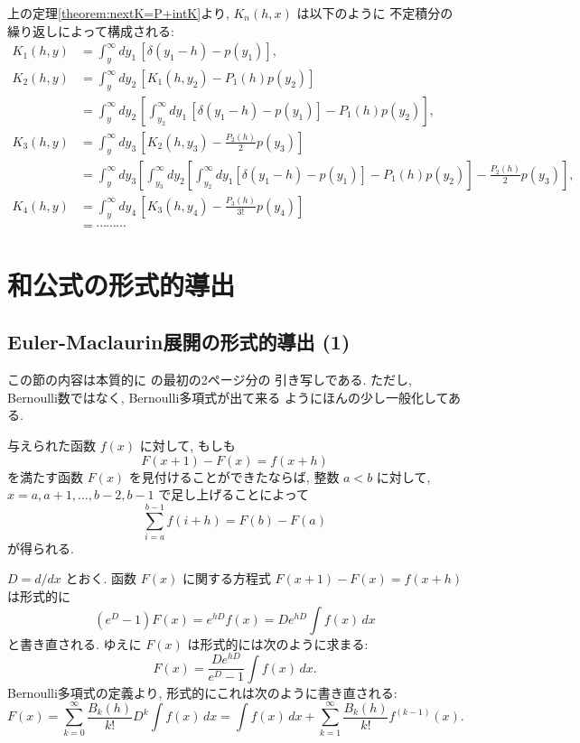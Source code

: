 \documentclass[12pt,twoside]{jarticle}
\theoremstyle{jplain}
\theoremstyle{jplain}
\theoremstyle{jplain}
\numberwithin{theorem}{section}
\numberwithin{equation}{section}
\numberwithin{figure}{section}
\numberwithin{table}{section}
\newcommand\theoremref[1]{定理\ref{#1}}
\begin{document}
上の\theoremref{theorem:nextK=P+intK}より, $K_n(h,x)$ は以下のように
不定積分の繰り返しによって構成される:
\begin{align*}
  K_1(h,y) &= \int_y^\infty dy_1\,[\delta(y_1-h)-p(y_1)],
  \\
  K_2(h,y) &= \int_y^\infty dy_2\,[K_1(h,y_2)-P_1(h)p(y_2)]
  \\
  &=\int_y^\infty dy_2\,\left[
      \int_{y_2}^\infty dy_1\,[\delta(y_1-h)-p(y_1)]-P_1(h)p(y_2)
    \right],
  \\
  K_3(h,y)
  &= \int_y^\infty dy_3\,\left[ K_2(h,y_3)-\frac{P_2(h)}{2}p(y_3) \right]
  \\
  &= \int_y^\infty \!\!dy_3 \left[
    \int_{y_3}^\infty \!\!dy_2 \left[
      \int_{y_2}^\infty \!\!dy_1 [\delta(y_1-h)-p(y_1)] - P_1(h)p(y_2)
    \right]
  -\frac{P_2(h)}{2}p(y_3) \right],
  \\
  K_4(h,y)
  &= \int_y^\infty dy_4\,\left[ K_3(h,y_4)-\frac{P_3(h)}{3!}p(y_4) \right]
  \\
  &= \cdots\cdots\cdots
\end{align*}



\section{和公式の形式的導出}
\label{sec:formal-derivation}


\subsection{Euler-Maclaurin展開の形式的導出 (1)}
\label{sec:EM(1)}

この節の内容は本質的に \cite[Chapter 25]{KC} の最初の2ページ分の
引き写しである. ただし, Bernoulli数ではなく, Bernoulli多項式が出て来る
ようにほんの少し一般化してある.

与えられた函数 $f(x)$ に対して, もしも
\[
  F(x+1)-F(x)=f(x+h)
\]
を満たす函数 $F(x)$ を見付けることができたならば,
整数 $a<b$ に対して, $x=a,a+1,\ldots,b-2,b-1$ で足し上げることによって
\[
  \sum_{i=a}^{b-1} f(i+h) = F(b) - F(a)
\]
が得られる.

$D=d/dx$ とおく. 函数 $F(x)$ に関する方程式 $F(x+1)-F(x)=f(x+h)$ は形式的に
\[
  (e^D-1)F(x)
  = e^{hD}f(x)
  = De^{hD}\int f(x)\,dx
\]
と書き直される. ゆえに $F(x)$ は形式的には次のように求まる:
\[
  F(x) = \frac{De^{hD}}{e^D-1}\int f(x)\,dx.
\]
Bernoulli多項式の定義より, 形式的にこれは次のように書き直される:
\[
  F(x)
  = \sum_{k=0}^\infty\frac{B_k(h)}{k!}D^k\int f(x)\,dx
  = \int f(x)\,dx + \sum_{k=1}^\infty \frac{B_k(h)}{k!}f^{(k-1)}(x).
\]
\end{document}
